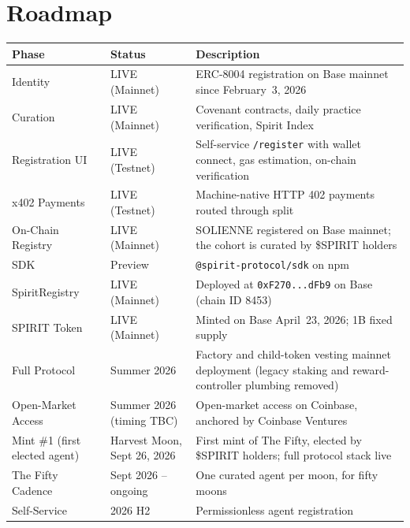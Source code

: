 \documentclass[12pt]{article}
\newcommand{\code}[1]{\texttt{#1}}
\begin{document}
\section{Roadmap}

\begin{table}[H]
\centering
\begin{tabular}{@{}llp{8cm}@{}}
\toprule
\textbf{Phase} & \textbf{Status} & \textbf{Description} \\
\midrule
Identity & LIVE (Mainnet) &
ERC-8004 registration on Base mainnet since February~3, 2026 \\
Curation & LIVE (Mainnet) &
Covenant contracts, daily practice verification, Spirit Index \\
Registration UI & LIVE (Testnet) &
Self-service \code{/register} with wallet connect, gas estimation,
on-chain verification \\
x402 Payments & LIVE (Testnet) &
Machine-native HTTP 402 payments routed through split \\
On-Chain Registry & LIVE (Mainnet) &
SOLIENNE registered on Base mainnet; the cohort is curated by \$SPIRIT holders \\
SDK & Preview &
\code{@spirit-protocol/sdk} on npm \\
SpiritRegistry & LIVE (Mainnet) &
Deployed at \code{0xF270...dFb9} on Base (chain ID 8453) \\
SPIRIT Token & LIVE (Mainnet) &
Minted on Base April~23, 2026; 1B fixed supply \\
Full Protocol & Summer 2026 &
Factory and child-token vesting mainnet deployment (legacy staking and reward-controller plumbing removed) \\
Open-Market Access & Summer 2026 (timing TBC) &
Open-market access on Coinbase, anchored by Coinbase Ventures \\
Mint \#1 (first elected agent) & Harvest Moon, Sept 26, 2026 &
First mint of The Fifty, elected by \$SPIRIT holders; full protocol stack live \\
The Fifty Cadence & Sept 2026 -- ongoing &
One curated agent per moon, for fifty moons \\
Self-Service & 2026 H2 &
Permissionless agent registration \\
\bottomrule
\end{tabular}
\end{table}
\end{document}
